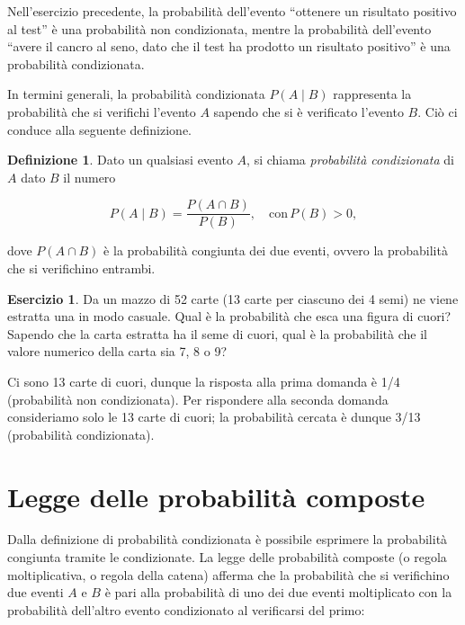 \documentclass[
  11pt,
]{krantz}
\theoremstyle{definition}
\newtheorem{definition}{Definizione}[chapter]
\theoremstyle{definition}
\theoremstyle{definition}
\newtheorem{exercise}{Esercizio}[chapter]
\theoremstyle{definition}
\theoremstyle{remark}
\begin{document}
Nell'esercizio precedente, la probabilità dell'evento ``ottenere un risultato positivo al test'' è una probabilità non condizionata, mentre la probabilità dell'evento ``avere il cancro al seno, dato che il test ha prodotto un risultato positivo'' è una probabilità condizionata.

In termini generali, la probabilità condizionata \(P(A \mid B)\) rappresenta la probabilità che si verifichi l'evento \(A\) sapendo che si è verificato l'evento \(B\). Ciò ci conduce alla seguente definizione.

\begin{definition}
Dato un qualsiasi evento \(A\), si chiama \emph{probabilità condizionata} di \(A\) dato \(B\) il numero

\begin{equation}
P(A \mid B) = \frac{P(A \cap B)}{P(B)}, \quad \text{con}\, P(B) > 0,
\label{eq:probcond}
\end{equation}

dove \(P(A\cap B)\) è la probabilità congiunta dei due eventi, ovvero la probabilità che si verifichino entrambi.
\end{definition}

\begin{exercise}
Da un mazzo di 52 carte (13 carte per ciascuno dei 4 semi) ne viene estratta una in modo casuale. Qual è la probabilità che esca una figura di cuori? Sapendo che la carta estratta ha il seme di cuori, qual è la probabilità che il valore numerico della carta sia 7, 8 o 9?

Ci sono 13 carte di cuori, dunque la risposta alla prima domanda è 1/4 (probabilità non condizionata). Per rispondere alla seconda domanda consideriamo solo le 13 carte di cuori; la probabilità cercata è dunque 3/13 (probabilità condizionata).
\end{exercise}

\hypertarget{legge-delle-probabilituxe0-composte}{%
\section{Legge delle probabilità composte}\label{legge-delle-probabilituxe0-composte}}

Dalla definizione di probabilità condizionata è possibile esprimere la probabilità congiunta tramite le condizionate. La legge delle probabilità composte (o regola moltiplicativa, o regola della catena) afferma che la probabilità che si verifichino due eventi \(A\) e \(B\) è pari alla probabilità di uno dei due eventi moltiplicato con la probabilità dell'altro evento condizionato al verificarsi del primo:
\end{document}
